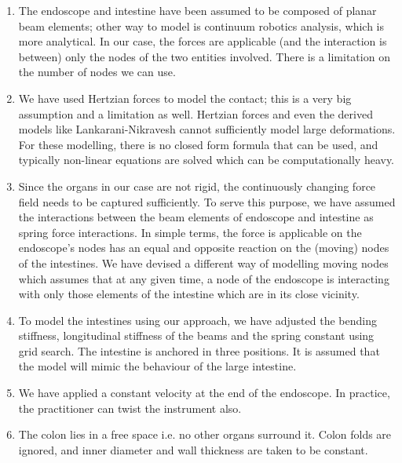 \documentclass[12pt]{report}
\begin{document}
\begin{enumerate}
	\item The endoscope and intestine have been assumed to be composed of planar beam elements; other way to model is continuum robotics analysis, which is more analytical. In our case, the forces are applicable (and the interaction is between) only the nodes of the two entities involved. There is a limitation on the number of nodes we can use.\par

	\item We have used Hertzian forces to model the contact; this is a very big assumption and a limitation as well. Hertzian forces and even the derived models like Lankarani-Nikravesh cannot sufficiently model large deformations. For these modelling, there is no closed form formula that can be used, and typically non-linear equations are solved which can be computationally heavy.\par

	\item Since the organs in our case are not rigid, the continuously changing force field needs to be captured sufficiently. To serve this purpose, we have assumed the interactions between the beam elements of endoscope and intestine as spring force interactions. In simple terms, the force is applicable on the endoscope’s nodes has an equal and opposite reaction on the (moving) nodes of the intestines. We have devised a different way of modelling moving nodes which assumes that at any given time, a node of the endoscope is interacting with only those elements of the intestine which are in its close vicinity.\par

	\item To model the intestines using our approach, we have adjusted the bending stiffness, longitudinal stiffness of the beams and the spring constant using grid search. The intestine is anchored in three positions. It is assumed that the model will mimic the behaviour of the large intestine.\par

	\item We have applied a constant velocity at the end of the endoscope. In practice, the practitioner can twist the instrument also.\par

	\item The colon lies in a free space i.e. no other organs surround it. Colon folds are ignored, and inner diameter and wall thickness are taken to be constant.
\end{enumerate}\par
\end{document}
